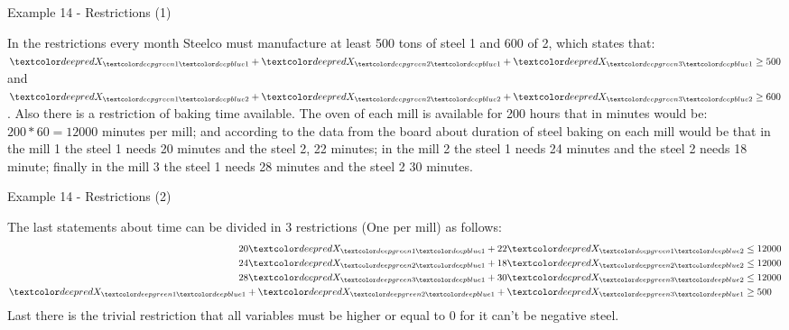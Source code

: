 \begin{frame}{Example 14 - Restrictions (1)}

In the restrictions every month Steelco must manufacture at least 500 tons of
steel 1 and 600 of 2, which states that:
$\colorij{X}{1}{1} + \colorij{X}{2}{1} + \colorij{X}{3}{1} \ge 500$ and
$\colorij{X}{1}{2} + \colorij{X}{2}{2} + \colorij{X}{3}{2} \ge 600$.
Also there is a restriction of baking time available. The oven of each mill is
available for 200 hours that in minutes would be: $200 * 60 = 12000$ minutes
per mill; and according to the data from the board about duration of steel
baking on each mill would be that in the mill 1 the steel 1 needs 20 minutes and
the steel 2, 22 minutes; in the mill 2 the steel 1 needs 24 minutes and the
steel 2 needs 18 minute; finally in the mill 3 the steel 1 needs 28 minutes and
the steel 2 30 minutes.

\end{frame}


\begin{frame}{Example 14 - Restrictions (2)}

The last statements about time can be divided in 3 restrictions (One per mill)
as follows:
\begin{align*}
    20\colorij{X}{1}{1} + 22\colorij{X}{1}{2} &\le 12000 \\
    24\colorij{X}{2}{1} + 18\colorij{X}{2}{2} &\le 12000 \\
    28\colorij{X}{3}{1} + 30\colorij{X}{3}{2} &\le 12000 \\
      \colorij{X}{1}{1} +   \colorij{X}{2}{1} + \colorij{X}{3}{1} &\ge 500
\end{align*}
Last there is the trivial restriction that all variables must be higher or equal
to 0 for it can't be negative steel.

\end{frame}
